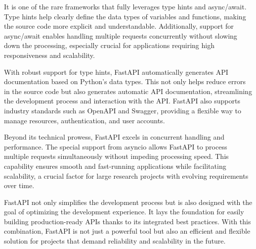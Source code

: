 It is one of the rare frameworks that fully leverages type hints and
async/await. Type hints help clearly define the data types of variables and
functions, making the source code more explicit and understandable.
Additionally, support for async/await enables handling multiple requests
concurrently without slowing down the processing, especially crucial for
applications requiring high responsiveness and scalability.

With robust support for type hints, FastAPI automatically generates API
documentation based on Python's data types. This not only helps reduce errors in
the source code but also generates automatic API documentation, streamlining the
development process and interaction with the API. FastAPI also supports industry
standards such as OpenAPI and Swagger, providing a flexible way to manage
resources, authentication, and user accounts.

Beyond its technical prowess, FastAPI excels in concurrent handling and
performance. The special support from asyncio allows FastAPI to process multiple
requests simultaneously without impeding processing speed. This capability
ensures smooth and fast-running applications while facilitating scalability, a
crucial factor for large research projects with evolving requirements over time.

FastAPI not only simplifies the development process but is also designed with
the goal of optimizing the development experience. It lays the foundation for
easily building production-ready APIs thanks to its integrated best practices.
With this combination, FastAPI is not just a powerful tool but also an efficient
and flexible solution for projects that demand reliability and scalability in
the future.
